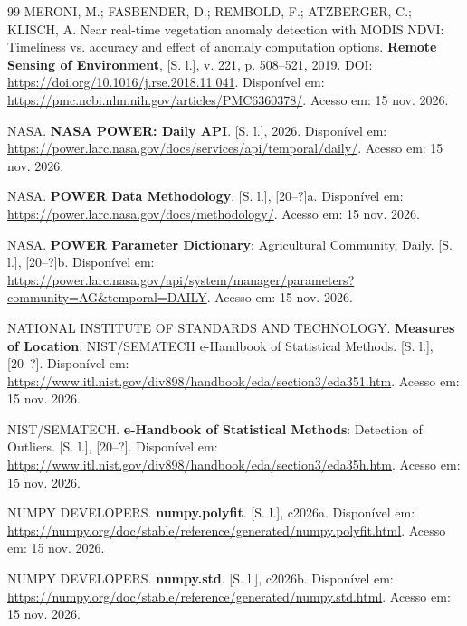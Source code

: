 \begin{thebibliography}{99}
\MakeUppercase{Meroni}, M.; \MakeUppercase{Fasbender}, D.; \MakeUppercase{Rembold}, F.; \MakeUppercase{Atzberger}, C.; \MakeUppercase{Klisch}, A.
Near real-time vegetation anomaly detection with {MODIS NDVI}: Timeliness vs. accuracy and effect of anomaly computation options.
\textbf{Remote Sensing of Environment}, [S. l.],
v. 221,
p. 508--521,
2019.
DOI: \url{https://doi.org/10.1016/j.rse.2018.11.041}.
Disponível em: \url{https://pmc.ncbi.nlm.nih.gov/articles/PMC6360378/}.
Acesso em: 15 nov. 2026.

\MakeUppercase{{NASA}}.
\textbf{{{NASA POWER}}: Daily API}.
[S. l.], 2026.
Disponível em: \url{https://power.larc.nasa.gov/docs/services/api/temporal/daily/}.
Acesso em: 15 nov. 2026.

\MakeUppercase{{NASA}}.
\textbf{POWER Data Methodology}.
[S. l.], [20--?]a.
Disponível em: \url{https://power.larc.nasa.gov/docs/methodology/}.
Acesso em: 15 nov. 2026.

\MakeUppercase{{NASA}}.
\textbf{POWER Parameter Dictionary}: Agricultural Community, Daily.
[S. l.], [20--?]b.
Disponível em: \url{https://power.larc.nasa.gov/api/system/manager/parameters?community=AG&temporal=DAILY}.
Acesso em: 15 nov. 2026.

\MakeUppercase{{National Institute of Standards and Technology}}.
\textbf{Measures of Location}: {NIST/SEMATECH e-Handbook of Statistical Methods}.
[S. l.], [20--?].
Disponível em: \url{https://www.itl.nist.gov/div898/handbook/eda/section3/eda351.htm}.
Acesso em: 15 nov. 2026.

\MakeUppercase{{NIST/SEMATECH}}.
\textbf{e-Handbook of Statistical Methods}: Detection of Outliers.
[S. l.], [20--?].
Disponível em: \url{https://www.itl.nist.gov/div898/handbook/eda/section3/eda35h.htm}.
Acesso em: 15 nov. 2026.

\MakeUppercase{{NumPy Developers}}.
\textbf{numpy.polyfit}.
[S. l.], c2026a.
Disponível em: \url{https://numpy.org/doc/stable/reference/generated/numpy.polyfit.html}.
Acesso em: 15 nov. 2026.

\MakeUppercase{{NumPy Developers}}.
\textbf{numpy.std}.
[S. l.], c2026b.
Disponível em: \url{https://numpy.org/doc/stable/reference/generated/numpy.std.html}.
Acesso em: 15 nov. 2026.


\end{thebibliography}
